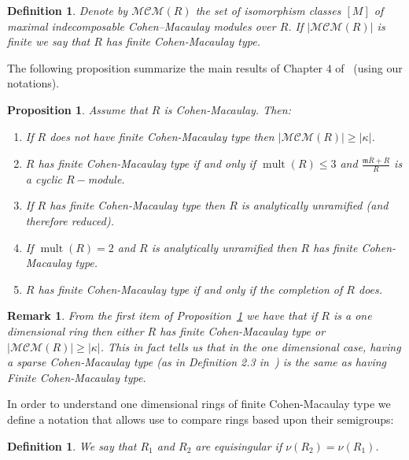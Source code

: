 \documentclass{article}
\newtheorem{definition}[theorem]{Definition}
\newtheorem{proposition}[theorem]{Proposition}
\newtheorem{remark}[theorem]{Remark}
\DeclareMathOperator{\mult}{mult}
\numberwithin{theorem}{section}
\begin{document}
\begin{definition}\label{def:cm_type}
     Denote by $\mathcal{MCM}(R)$ the set of isomorphism classes $[M]$ of maximal indecomposable Cohen–Macaulay modules over $R$. If $|\mathcal{MCM}(R)|$ is finite we say that $R$ has finite Cohen-Macaulay type.  
\end{definition}

The following proposition summarize the main results of Chapter $4$ of~\cite{leuschke2012cohen} (using our notations). 

\begin{proposition}\label{prop:CMtype_onedim}
Assume that $R$ is Cohen-Macaulay. Then: 
    \begin{enumerate}
        \item If $R$ does not have finite Cohen-Macaulay type then $|\mathcal{MCM}(R)| \geq|\kappa|$.  
        \item $R$ has finite Cohen-Macaulay type if and only if $\mult(R) \leq 3$ and $\frac{\mathfrak{m}\overline{R}+R}{R}$ is a cyclic $R-$module. 
        \item If $R$ has finite Cohen-Macaulay type then $R$ is analytically unramified (and therefore reduced). 
        \item If $\mult(R)=2$ and $R$ is analytically unramified then $R$ has finite Cohen-Macaulay type. 
        \item $R$ has finite Cohen-Macaulay type if and only if the completion of $R$ does. 
    \end{enumerate}
\end{proposition}

\begin{remark}
\textup{From the first item of Proposition~\ref{prop:CMtype_onedim} we have that if $R$ is a one dimensional ring then either $R$ has finite Cohen-Macaulay type or $|\mathcal{MCM}(R)|\geq|\kappa|$. This in fact tells us that in the one dimensional case, having a sparse Cohen-Macaulay type (as in Definition 2.3 in~\cite{svoray2025ade}) is the same as having Finite Cohen-Macaulay type.}
\end{remark}

In order to understand one dimensional rings of finite Cohen-Macaulay type we define a notation that allows use to compare rings based upon their semigroups:

\begin{definition}\label{def:equidominated}
    We say that $R_1$ and $R_2$ are equisingular if $\nu(R_2) = \nu(R_1)$.  
\end{definition}
\end{document}

